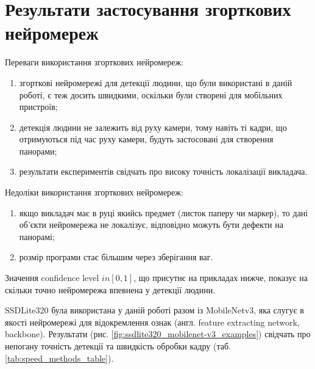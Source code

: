 \section{Результати застосування згорткових нейромереж}

Переваги використання згорткових нейромереж:
\begin{enumerate}
    \item згорткові нейромережі для детекції людини, що були використані в даній роботі,
          є теж досить швидкими, оскільки були створені для мобільних пристроїв;
    \item детекція людини не залежить від руху камери, тому навіть ті кадри, що
          отримуються під час руху камери, будуть застосовані для створення панорами;
    \item результати експериментів свідчать про високу точність локалізації викладача.
\end{enumerate}

Недоліки використання згорткових нейромереж:
\begin{enumerate}
    \item якщо викладач має в руці якийсь предмет (листок паперу чи маркер), то дані
          об'єкти нейромережа не локалізує, відповідно можуть бути дефекти на панорамі;
    \item розмір програми стає більшим через зберігання ваг.
\end{enumerate}

Значення confidence level $in [0,1]$, що присутнє на прикладах нижче, показує на скільки точно нейромережа
впевнена у детекції людини.

SSDLite320 була використана у даній роботі разом із MobileNetv3, яка слугує в якості нейромережі для
відокремлення ознак  (англ. feature extracting network, backbone). Результати
(рис. \ref{fig:ssdlite320_mobilenet-v3_examples}) свідчать про
непогану точність детекції та швидкість обробки кадру (таб. \ref{tab:speed_methods_table}).

